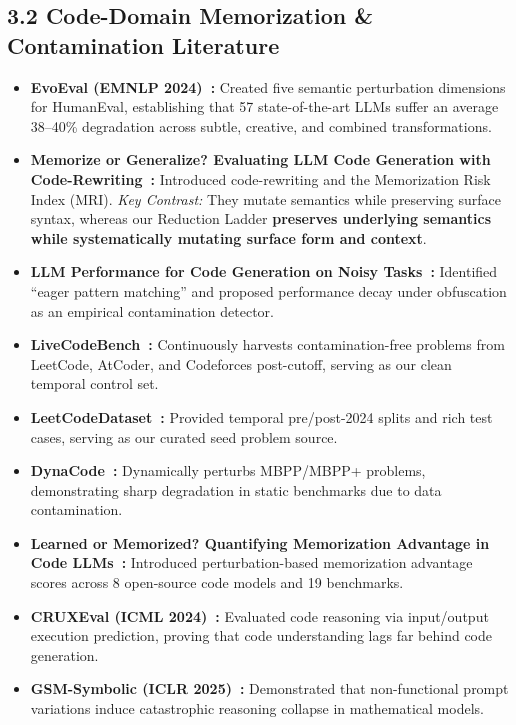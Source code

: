 \documentclass[12pt, a4paper]{article}
\begin{document}
\subsection{3.2 Code-Domain Memorization \& Contamination Literature}

\begin{itemize}[leftmargin=1.5em, itemsep=4pt]
  \item \textbf{EvoEval (EMNLP 2024)~\cite{evoeval}:} Created five semantic perturbation dimensions for HumanEval, establishing that 57 state-of-the-art LLMs suffer an average 38--40\% degradation across subtle, creative, and combined transformations.
  \item \textbf{Memorize or Generalize? Evaluating LLM Code Generation with Code-Rewriting~\cite{memorize_or_generalize}:} Introduced code-rewriting and the Memorization Risk Index (MRI). \emph{Key Contrast:} They mutate semantics while preserving surface syntax, whereas our Reduction Ladder \textbf{preserves underlying semantics while systematically mutating surface form and context}.
  \item \textbf{LLM Performance for Code Generation on Noisy Tasks~\cite{noisy_code_tasks}:} Identified ``eager pattern matching'' and proposed performance decay under obfuscation as an empirical contamination detector.
  \item \textbf{LiveCodeBench~\cite{livecodebench}:} Continuously harvests contamination-free problems from LeetCode, AtCoder, and Codeforces post-cutoff, serving as our clean temporal control set.
  \item \textbf{LeetCodeDataset~\cite{leetcode_dataset}:} Provided temporal pre/post-2024 splits and rich test cases, serving as our curated seed problem source.
  \item \textbf{DynaCode~\cite{dynacode}:} Dynamically perturbs MBPP/MBPP+ problems, demonstrating sharp degradation in static benchmarks due to data contamination.
  \item \textbf{Learned or Memorized? Quantifying Memorization Advantage in Code LLMs~\cite{learned_or_memorized}:} Introduced perturbation-based memorization advantage scores across 8 open-source code models and 19 benchmarks.
  \item \textbf{CRUXEval (ICML 2024)~\cite{cruxeval}:} Evaluated code reasoning via input/output execution prediction, proving that code understanding lags far behind code generation.
  \item \textbf{GSM-Symbolic (ICLR 2025)~\cite{gsm_symbolic}:} Demonstrated that non-functional prompt variations induce catastrophic reasoning collapse in mathematical models.
\end{itemize}
\end{document}

